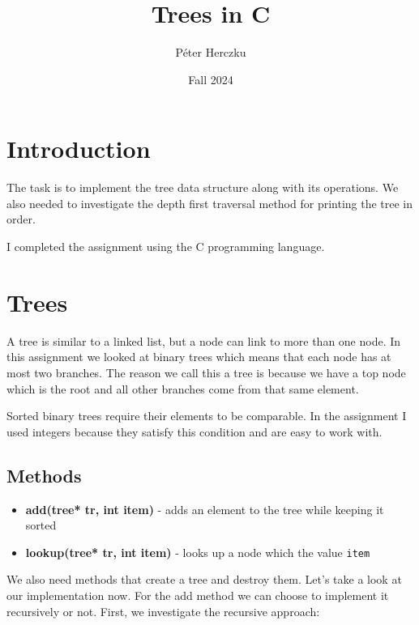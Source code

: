 \documentclass[a4paper,11pt]{article}
\begin{document}
    \title{
        \textbf{Trees in C}
    }
    \author{Péter Herczku}
    \date{Fall 2024}

    \maketitle

    \section*{Introduction}

    The task is to implement the tree data structure along with its operations.
    We also needed to investigate the depth first traversal method for printing the tree in order.

    I completed the assignment using the C programming language.

    \section*{Trees}

    A tree is similar to a linked list, but a node can link to more than one node.
    In this assignment we looked at binary trees which means that each node has at most two branches.
    The reason we call this a tree is because we have a top node which is the root and all other branches come from that same element.
    
    Sorted binary trees require their elements to be comparable. 
    In the assignment I used integers because they satisfy this condition and are easy to work with.

    \subsection*{Methods}

    \begin{itemize}
        \item \textbf{add(tree* tr, int item)} - adds an element to the tree while keeping it sorted
        \item \textbf{lookup(tree* tr, int item)} - looks up a node which the value {\tt item}
     \end{itemize}

     We also need methods that create a tree and destroy them. 
     Let's take a look at our implementation now.
     For the add method we can choose to implement it recursively or not. First, we investigate the recursive approach:
\end{document}

